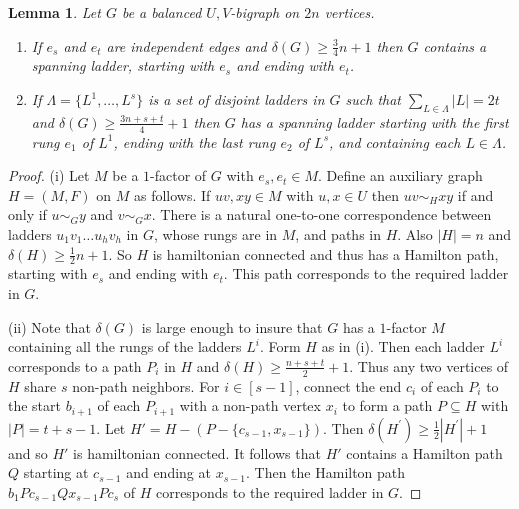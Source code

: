 \documentclass[oneside,12pt]{memoir}
\newtheorem{lemma}[theorem]{Lemma}
\begin{document}
\begin{lemma}
\label{ell}Let $G$ be a balanced $U,V$-bigraph on $2n$ vertices.

\begin{enumerate}
\item If $e_{s}$ and $e_{t}$ are independent edges and $\delta(G)\geq\frac
{3}{4}n+1$ then $G$ contains a spanning ladder, starting with $e_{s}$ and
ending with $e_{t}$.

\item If $\Lambda=\{L^{1},\dots,L^{s}\} $ is a set of disjoint ladders in $G$ such
that $\sum_{L\in \Lambda}|L| =2t$ and $\delta
(G)\geq\frac{3n+s+t}{4}+1$ then $G$ has a spanning ladder starting
with the first rung $e_{1}$ of $L^{1}$, ending with the last rung $e_{2}$ of $L^{s}$, and containing each $L\in \Lambda$.
\end{enumerate}
\end{lemma}

\begin{proof}
(i) Let $M$ be a $1$-factor of $G$ with $e_{s},e_{t}\in M$. Define an
auxiliary graph $H=(M,F)$ on $M$ as follows. If $uv,xy\in M$ with $u,x\in U$
then $uv\sim_{H}xy$ if and only if $u\sim_{G}y$ and $v\sim_{G}x$. There is a
natural one-to-one correspondence between ladders $u_{1}v_{1}\dots u_{h}v_{h}$
in $G$, whose rungs are in $M$, and paths in $H$. Also $\left\vert
H\right\vert =n$ and $\delta(H)\geq\frac{1}{2}n+1$. So $H$ is hamiltonian
connected and thus has a Hamilton path, starting with $e_{s}$ and ending with $e_{t}$.
This path corresponds to the required ladder in $G$.

(ii) Note that $\delta(G)$ is large enough to insure that $G$ has a $1$-factor $M$ containing all the rungs of the ladders $L^i$. Form $H$ as in (i). Then each
ladder $L^{i}$ corresponds to a path $P_{i}$ in $H$ and $\delta(H)\geq\frac{n+s+t}{2}+1$. Thus any two vertices of $H$ share $s$ non-path neighbors. For $i\in[s-1]$, connect the end $c_i$ of each $P_i$ to the start $b_{i+1}$ of each $P_{i+1}$ with a non-path vertex $x_i$ to form a path $P\subseteq H$ with $|P|=t+s-1$. Let $H'=H-(P-\{c_{s-1},x_{s-1}\})$. Then $\delta(H^{\prime})\geq\frac{1}{2}|H^{\prime}|+1$ and so $H'$ is hamiltonian connected. It
follows that $H'$ contains a Hamilton path $Q$ starting at $c_{s-1}$ and ending
at $x_{s-1}$. Then the Hamilton path $b_1Pc_{s-1}Qx_{s-1}Pc_s$ of $H$ corresponds to
the required ladder in $G$.
\end{proof}
\end{document}
